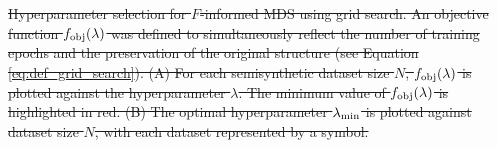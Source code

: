 \documentclass[11pt]{article}
\newcommand{\1}{{\rm 1}\kern-0.24em{\rm I}}
\providecommand{\DIFdeltex}[1]{{\protect\color{red}\sout{#1}}}                      %
\providecommand{\DIFdelbegin}{} %
\providecommand{\DIFdelend}{} %
\providecommand{\DIFdelFL}[1]{\DIFdel{#1}} %
\providecommand{\DIFdel}[1]{\texorpdfstring{\DIFdeltex{#1}}{}} %
\newcommand{\DIFscaledelfig}{0.5}
\newlength{\DIFdelgraphicswidth} %
\newlength{\DIFdelgraphicsheight} %
\newcommand{\DIFdelincludegraphics}[2][]{%
\sbox{\DIFdelgraphicsbox}{\DIFOincludegraphics[#1]{#2}}%
\settoboxwidth{\DIFdelgraphicswidth}{\DIFdelgraphicsbox} %
\settoboxtotalheight{\DIFdelgraphicsheight}{\DIFdelgraphicsbox} %
\scalebox{\DIFscaledelfig}{%
\parbox[b]{\DIFdelgraphicswidth}{\usebox{\DIFdelgraphicsbox}\\[-\baselineskip] \rule{\DIFdelgraphicswidth}{0em}}\llap{\resizebox{\DIFdelgraphicswidth}{\DIFdelgraphicsheight}{%
\setlength{\unitlength}{\DIFdelgraphicswidth}%
\begin{picture}(1,1)%
\thicklines\linethickness{2pt} %
{\color[rgb]{1,0,0}\put(0,0){\framebox(1,1){}}}%
{\color[rgb]{1,0,0}\put(0,0){\line( 1,1){1}}}%
{\color[rgb]{1,0,0}\put(0,1){\line(1,-1){1}}}%
\end{picture}%
}\hspace*{3pt}}} %
} %
\DeclareRobustCommand{\DIFdelbegin}{\DIFOdelbegin \let\includegraphics\DIFdelincludegraphics} %
\DeclareRobustCommand{\DIFdelend}{\DIFOaddend \let\includegraphics\DIFOincludegraphics} %
\begin{document}
\DIFdelbegin %
{%
\DIFdelFL{Hyperparameter selection for $F$-informed MDS using grid search. An objective function $f_{\rm obj}(\lambda)$ was defined to simultaneously reflect the number of training epochs and the preservation of the original structure (see Equation \ref{eq:def_grid_search}). (A) For each semisynthetic dataset size $N$, $f_{\rm obj}(\lambda)$ is plotted against the hyperparameter $\lambda$. The minimum value of $f_{\rm obj}(\lambda)$ is highlighted in red. (B) The optimal hyperparameter $\lambda_{\rm min}$ is plotted against dataset size $N$, with each dataset represented by a symbol.}}
\DIFdelend %
\end{document}
